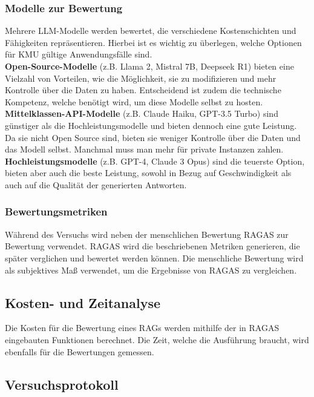 \subsubsection{Modelle zur Bewertung}
Mehrere LLM-Modelle werden bewertet, die verschiedene Kostenschichten und Fähigkeiten repräsentieren. Hierbei ist es wichtig zu überlegen, welche Optionen für KMU gültige Anwendungsfälle sind.\\
\textbf{Open-Source-Modelle} (z.B. Llama 2, Mistral 7B, Deepseek R1) bieten eine Vielzahl von Vorteilen, wie die Möglichkeit, sie zu modifizieren und mehr Kontrolle über die Daten zu haben. Entscheidend ist zudem die technische Kompetenz, welche benötigt wird, um diese Modelle selbst zu hosten.\\
\textbf{Mittelklassen-API-Modelle} (z.B. Claude Haiku, GPT-3.5 Turbo) sind günstiger als die Hochleistungsmodelle und bieten dennoch eine gute Leistung. Da sie nicht Open Source sind, bieten sie weniger Kontrolle über die Daten und das Modell selbst. Manchmal muss man mehr für private Instanzen zahlen.\\
\textbf{Hochleistungsmodelle} (z.B. GPT-4, Claude 3 Opus) sind die teuerste Option, bieten aber auch die beste Leistung, sowohl in Bezug auf Geschwindigkeit als auch auf die Qualität der generierten Antworten.\\

\subsubsection{Bewertungsmetriken}
Während des Versuchs wird neben der menschlichen Bewertung RAGAS zur Bewertung verwendet.
RAGAS wird die beschriebenen Metriken generieren, die später verglichen und bewertet werden können.
Die menschliche Bewertung wird als subjektives Maß verwendet, um die Ergebnisse von RAGAS zu vergleichen.

\subsection{Kosten- und Zeitanalyse}
Die Kosten für die Bewertung eines RAGs werden mithilfe der in RAGAS eingebauten Funktionen berechnet.
Die Zeit, welche die Ausführung braucht, wird ebenfalls für die Bewertungen gemessen.

\subsection{Versuchsprotokoll}

